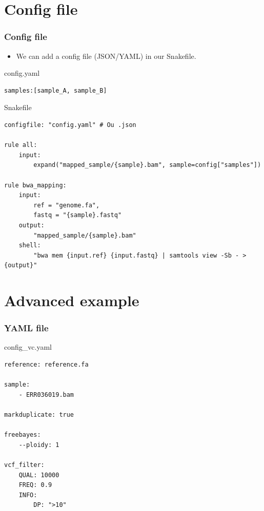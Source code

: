 \documentclass{beamer}
\begin{document}
\section{Config file}

\begin{frame}[fragile]
    \frametitle{Config file}
    \begin{itemize}
        \item We can add a config file (JSON/YAML) in our Snakefile.
    \end{itemize}
    \begin{block}{config.yaml}
        \begin{lstlisting}
samples:[sample_A, sample_B]
        \end{lstlisting}
    \end{block}
    \begin{block}{Snakefile}
    \begin{lstlisting}
configfile: "config.yaml" # Ou .json

rule all:
    input:
        expand("mapped_sample/{sample}.bam", sample=config["samples"])

rule bwa_mapping:
    input:
        ref = "genome.fa",
        fastq = "{sample}.fastq"
    output:
        "mapped_sample/{sample}.bam"
    shell:
        "bwa mem {input.ref} {input.fastq} | samtools view -Sb - > {output}"
    \end{lstlisting}
    \end{block}
\end{frame}

\section{Advanced example}

\begin{frame}[fragile]
    \frametitle{YAML file}
    \begin{block}{config\_vc.yaml}
    \begin{lstlisting}
reference: reference.fa

sample: 
    - ERR036019.bam

markduplicate: true

freebayes:
    --ploidy: 1

vcf_filter:
    QUAL: 10000
    FREQ: 0.9
    INFO:
        DP: ">10"
    \end{lstlisting}
    \end{block}
\end{frame}
\end{document}
